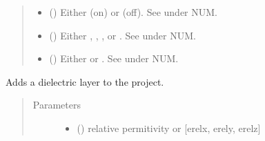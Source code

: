 \documentclass[letterpaper,10pt,english,openany]{sphinxmanual}
\begin{document}
\begin{fulllineitems}
\begin{fulllineitems}
\begin{quote}
\begin{description}
\begin{itemize}
\item {} 
 () \textendash{} Either  (on) or  (off). See \label{\detokenize{source/sonpy:id25}}{\hyperref[\detokenize{source/users_guide:son15}]{\sphinxcrossref{{[}Son15{]}}}} under NUM.

\item {} 
 () \textendash{} Either , , ,  or . See \label{\detokenize{source/sonpy:id26}}{\hyperref[\detokenize{source/users_guide:son15}]{\sphinxcrossref{{[}Son15{]}}}} under NUM.

\item {} 
 () \textendash{} Either  or . See \label{\detokenize{source/sonpy:id27}}{\hyperref[\detokenize{source/users_guide:son15}]{\sphinxcrossref{{[}Son15{]}}}} under NUM.

\end{itemize}

\end{description}\end{quote}

\end{fulllineitems}


\begin{fulllineitems}
\label{\detokenize{source/sonpy:sonpy.sonnet.addBrick}}
Adds a dielectric layer to the project.
\begin{quote}\begin{description}
\item[{Parameters}] \leavevmode\begin{itemize}
\item {} 
 () \textendash{} relative permitivity or {[}erelx, erely, erelz{]}


\end{itemize}
\end{description}
\end{quote}
\end{fulllineitems}
\end{fulllineitems}
\end{document}
